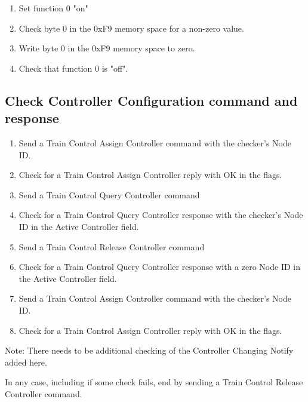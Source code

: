 \begin{enumerate}

    \item Set function 0 "on"

    \item Check byte 0 in the 0xF9 memory space for a non-zero value.

    \item Write byte 0 in the 0xF9 memory space to zero.

    \item Check that function 0 is "off".

\end{enumerate}


\subsection{Check Controller Configuration command and response}

\begin{enumerate}

    \item Send a Train Control Assign Controller command with the checker's Node ID.
    \item Check for a Train Control Assign Controller reply with OK in the flags.

    \item Send a Train Control Query Controller command
    \item Check for a Train Control Query Controller response with the checker's Node ID
        in the Active Controller field.

    \item Send a Train Control Release Controller command
    \item Check for a Train Control Query Controller response with a zero Node ID
        in the Active Controller field.
    
    \item Send a Train Control Assign Controller command with the checker's Node ID.
    \item Check for a Train Control Assign Controller reply with OK in the flags.

\end{enumerate}

Note:  There needs to be additional checking of the Controller Changing Notify 
    added here.

In any case, including if some check fails, end by sending a Train Control Release
    Controller command.

